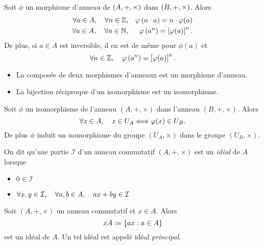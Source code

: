 \documentclass{magnolia}
\begin{document}
\begin{proposition}
Soit $\phi$ un morphisme d'anneau de $\left(A,+,\times\right)$ dans $\left(B,+,\times\right)$.
Alors
\begin{eqnarray*}
\forall a\in A ,\quad \forall n\in\mathbb{Z}, & & \varphi\left(n\cdot a\right)=n\cdot\varphi(a)\\
\forall a\in A ,\quad \forall n\in\mathbb{N}, & & \varphi\left(a^n\right)=\left[\varphi(a)\right]^n.
\end{eqnarray*}
De plus, si $a\in A$ est inversible, il en est de même pour $\phi(a)$ et
\[\forall n\in\mathbb{Z} ,\quad \varphi\left(a^n\right)=\left[\varphi(a)\right]^n.\]
\end{proposition}


\begin{proposition}
\begin{itemize}
\item La composée de deux morphismes d'anneaux est un morphisme d'anneau.
\item La bijection réciproque d'un isomorphisme est un isomorphisme.
\end{itemize}
\end{proposition}

\begin{proposition}
Soit $\phi$ un isomorphisme de l'anneau $(A,+,\times)$ dans l'anneau $(B,+,\times)$. Alors
\[\forall x\in A,\quad x\in U_A \Longleftrightarrow \varphi(x)\in U_B.\]
De plus $\phi$ induit un isomorphisme du groupe $(U_A,\times)$ dans le groupe $(U_B,\times)$.
\end{proposition}

\begin{definition}
On dit qu'une partie $\mathcal{I}$ d'un anneau commutatif $(A,+,\times)$ est un \emph{idéal} de $A$
lorsque
\begin{itemize}
\item $0\in\mathcal{I}$
\item $\forall x,y\in\mathcal{I},\quad \forall a,b\in A,\quad ax+by\in\mathcal{I}$
\end{itemize}
\end{definition}

\begin{proposition}
Soit $(A,+,\times)$ un anneau commutatif et $x\in A$. Alors
\[x A\coloneqq\left\{ax : a\in A\right\}\]
est un idéal de $A$. Un tel idéal est appelé idéal \emph{principal}.
\end{proposition}
\end{document}
